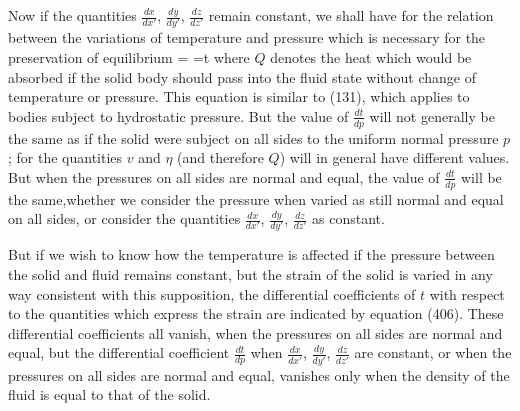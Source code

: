 \documentclass[12pt]{memoir}
\begin{document}
{Now if the quantities $\frac{dx}{dx'}$, $\frac{dy}{dy'}$, $\frac{dz}{dz'}$ remain constant, we shall have for the relation between the variations of temperature and pressure which is necessary for the preservation of equilibrium
\eqs {} = =t  \label{407}\eqe
where $Q$ denotes the heat which would be absorbed if the solid body should pass into the fluid state without change of temperature or pressure. This equation is similar to (131), which applies to bodies subject to hydrostatic pressure. But the value of $\frac{dt}{dp}$ will not generally be the same as if the solid were subject on all sides to the uniform normal pressure $p$; for the quantities $v$ and $\eta$ (and therefore $Q$) will in general have different values. But when the pressures on all sides are normal and equal, the value of $\frac{dt}{dp}$  will be the same,whether we consider the pressure when varied as still normal and equal on all sides, or consider the quantities $\frac{dx}{dx'}$, $\frac{dy}{dy'}$, $\frac{dz}{dz'}$ as constant.

But if we wish to know how the temperature is affected if the pressure between the solid and fluid remains constant, but the strain of the solid is varied in any way consistent with this supposition, the differential coefficients of $t$ with respect to the quantities which express the strain are indicated by equation (406). These differential coefficients all vanish, when the pressures on all sides are normal and equal, but the differential coefficient $\frac{dt}{dp}$ when $\frac{dx}{dx'}$, $\frac{dy}{dy'}$, $\frac{dz}{dz'}$ are constant, or when the pressures on all sides are normal and equal, vanishes only when the density of the fluid is equal to that of the solid.


}
\end{document}
